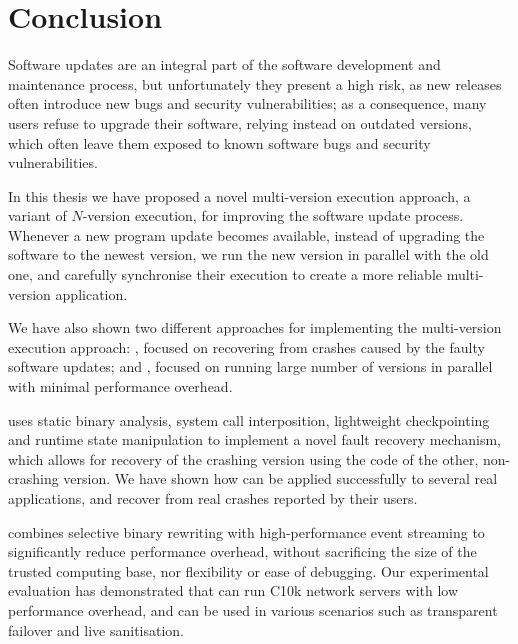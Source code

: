 \chapter{Conclusion}
\label{chap:conclusion}

Software updates are an integral part of the software development and
maintenance process, but unfortunately they present a high risk, as new
releases often introduce new bugs and security vulnerabilities; as a
consequence, many users refuse to upgrade their software, relying instead on
outdated versions, which often leave them exposed to known software bugs and
security vulnerabilities.

In this thesis we have proposed a novel multi-version execution approach, a
variant of $N$-version execution, for improving the software update process.
Whenever a new program update becomes available, instead of upgrading the
software to the newest version, we run the new version in parallel with the old
one, and carefully synchronise their execution to create a more reliable
multi-version application.


We have also shown two different approaches for implementing the multi-version
execution approach: \mx, focused on recovering from crashes caused by the
faulty software updates; and \varan, focused on running large number of
versions in parallel with minimal performance overhead.

\mx uses static binary analysis, system call interposition, lightweight
checkpointing and runtime state manipulation to implement a novel fault recovery
mechanism, which allows for recovery of the crashing version using the code
of the other, non-crashing version. We have shown how \mx can be applied
successfully to several real applications, and recover from real crashes
reported by their users.

\varan combines selective binary rewriting with high-performance event
streaming to significantly reduce performance overhead, without sacrificing the
size of the trusted computing base, nor flexibility or ease of debugging.  Our
experimental evaluation has demonstrated that \varan can run C10k network
servers with low performance overhead, and can be used in various scenarios
such as transparent failover and live sanitisation.

